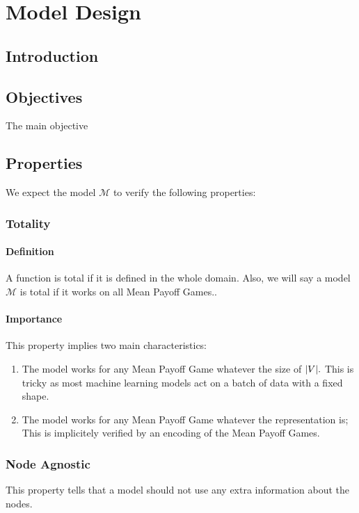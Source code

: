 \chapter{Model Design}
\label{section:ModelDesign}
\label{chapter:ModelDesign}

\section{Introduction}

\section{Objectives}
The main objective

\section{Properties}
\label{section:ModelDesign:Properties}
We expect the model $\mathcal{M}$ to verify the following properties:

\subsection{Totality}
\subsubsection{Definition}
A function is total if it is defined in the whole domain.
\newline Also, we will say a model $\mathcal{M}$ is total if it works on all Mean Payoff Games..
\subsubsection{Importance}
This property implies two main characteristics:
\begin{enumerate}
	\item The model works for any Mean Payoff Game whatever the size of $\lvert V \rvert.$ This is tricky as most machine learning models act on a batch of data with a fixed shape.
	\item The model works for any Mean Payoff Game whatever the representation is; This is implicitely verified by an encoding of the Mean Payoff Games.
\end{enumerate}

\subsection{Node Agnostic}
This property tells that a model should not use any extra information about the nodes.
